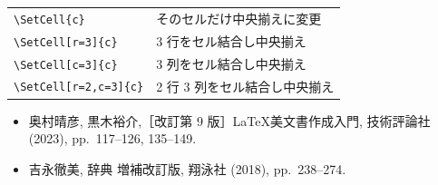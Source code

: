 \begin{tcolorbox}[title={\texttt{tblr} 環境でセル結合する際に使用するコマンド}]
    \begin{tabular}{ll}
        \verb|\SetCell{c}|   & そのセルだけ中央揃えに変更 \\
        \verb|\SetCell[r=3]{c}|  & 3 行をセル結合し中央揃え \\
        \verb|\SetCell[c=3]{c}|  & 3 列をセル結合し中央揃え \\
        \verb|\SetCell[r=2,c=3]{c}|  & 2 行 3 列をセル結合し中央揃え \\
    \end{tabular}
\end{tcolorbox}

\begin{tcolorbox}[title={第~\ref{ch:figure_table}~章の参考文献}, colback=yellow!5!white, colframe=yellow!75!black, coltitle=black]
    \begin{itemize}
        \item 奥村晴彦, 黒木裕介,［改訂第 9 版］\LaTeX 美文書作成入門, 技術評論社 (2023), pp.~117--126, 135--149.
        \item 吉永徹美, \LaTeXe 辞典 増補改訂版, 翔泳社 (2018), pp.~238--274.
    \end{itemize}
\end{tcolorbox}


